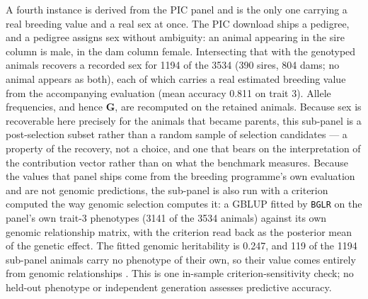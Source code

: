 \documentclass[11pt]{article}
\newcommand{\bG}{\mathbf{G}}
\begin{document}
A fourth instance is derived from the PIC panel and is the only one carrying a real breeding value and a real sex at once. The PIC download ships a pedigree, and a pedigree assigns sex without ambiguity: an animal appearing in the sire column is male, in the dam column female. Intersecting that with the genotyped animals recovers a recorded sex for 1194 of the 3534 (390 sires, 804 dams; no animal appears as both), each of which carries a real estimated breeding value from the accompanying evaluation (mean accuracy 0.811 on trait 3). Allele frequencies, and hence $\bG$, are recomputed on the retained animals. Because sex is recoverable here precisely for the animals that became parents, this sub-panel is a post-selection subset rather than a random sample of selection candidates --- a property of the recovery, not a choice, and one that bears on the interpretation of the contribution vector rather than on what the benchmark measures. Because the values that panel ships come from the breeding programme's own evaluation and are not genomic predictions, the sub-panel is also run with a criterion computed the way genomic selection computes it: a GBLUP fitted by \texttt{BGLR} on the panel's own trait-3 phenotypes (3141 of the 3534 animals) against its own genomic relationship matrix, with the criterion read back as the posterior mean of the genetic effect. The fitted genomic heritability is 0.247, and 119 of the 1194 sub-panel animals carry no phenotype of their own, so their value comes entirely from genomic relationships . This is one in-sample criterion-sensitivity check; no held-out phenotype or independent generation assesses predictive accuracy.
\end{document}
